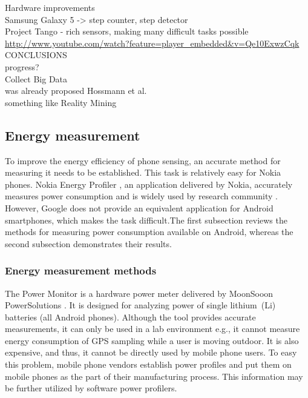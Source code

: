 Hardware improvements\\
	Samsung Galaxy 5 -> step counter, step detector\\
	Project Tango - rich sensors, making many difficult tasks possible\cite{google:tango}\\
		\url{http://www.youtube.com/watch?feature=player_embedded&v=Qe10ExwzCqk}
CONCLUSIONS\\
	progress?\\
	Collect Big Data\\
		was already proposed Hossmann et al.\cite{hossmann:bigdatasets}\\
		something like Reality Mining \cite{eagle:realitymining}\\
		
\subsection{Energy measurement}
\hspace{10pt} To improve the energy efficiency of phone sensing, an accurate method for measuring it needs to be established. This task is relatively easy for Nokia phones. Nokia Energy Profiler \cite{nokia:profiler}, an application delivered by Nokia,  accurately measures power consumption and is widely used by research community \cite{kjaergaard:entracked} \cite{lu:jigsaw} \cite{li:status}. However, Google does not provide an equivalent application for Android smartphones, which makes the task difficult.The first subsection reviews the methods for measuring power consumption available on Android, whereas the second subsection demonstrates their results.

\subsubsection{Energy measurement methods}

\hspace{10pt} The Power Monitor is a hardware power meter delivered by MoonSooon PowerSolutions \cite{monsoon:powermonitor}.  It is designed for analyzing power of single lithium\ (Li) batteries (all Android phones). Although the tool provides accurate measurements, it can only be used in a lab environment e.g., it cannot measure energy consumption of GPS sampling while a user is moving outdoor. It is also expensive, and thus, it cannot be directly used by mobile phone users. To easy this problem, mobile phone vendors establish power profiles and put them on mobile phones \cite{android:powerprofiles} as the part of their manufacturing process. This information may be further utilized by software power profilers.

